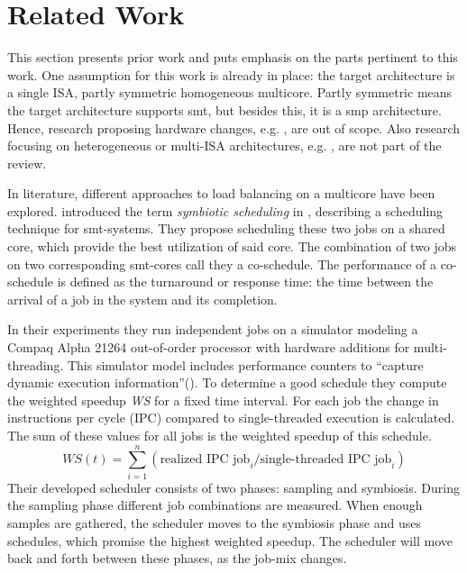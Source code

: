 \section{Related Work}
\label{state:related}

This section presents prior work and puts emphasis on the parts pertinent to
this work.
One assumption for this work is already in place:
the target architecture is a single ISA, partly symmetric homogeneous
multicore.
Partly symmetric means the target architecture supports \gls{smt},
but besides this, it is a \gls{smp} architecture.
Hence, research proposing hardware changes, e.g. \cite{cruz_dynamic_2014},
are out of scope.
Also research focusing on heterogeneous or multi-ISA architectures, e.g.
\cite{sarma_smartbalance_2015}, are not part of the review.



In literature, different approaches to load balancing on a multicore have been
explored.
\citeauthor{snavely_symbiotic_2000} introduced the term \emph{symbiotic
scheduling} in \cite{snavely_symbiotic_2000}, describing a scheduling technique
for \gls{smt}-systems.
They propose scheduling these two jobs on a shared core, which provide the best
utilization of said core.
The combination of two jobs on two corresponding \gls{smt}-cores call they a
co-schedule.
The performance of a co-schedule is defined as the turnaround or response time:
the time between the arrival of a job in the system and its completion.

In their experiments they run independent jobs on a simulator modeling a Compaq
Alpha 21264 out-of-order processor with hardware additions for multi-threading.
This simulator model includes performance counters to ``capture dynamic execution
information''(\autocite[236]{snavely_symbiotic_2000}).
To determine a good schedule they compute the weighted speedup \textit{WS} for
a fixed time interval.
For each job the change in instructions per cycle (IPC) compared to
single-threaded execution is calculated.
The sum of these values for all jobs is the weighted speedup of this
schedule.
$$ WS(t) = \sum_{i=1}^n (\text{realized IPC job}_i / \text{single-threaded IPC
job}_i)$$
Their developed scheduler consists of two phases: sampling and symbiosis.
During the sampling phase different job combinations are measured.
When enough samples are gathered, the scheduler moves to the symbiosis phase
and uses schedules, which promise the highest weighted speedup.
The scheduler will move back and forth between these phases, as the job-mix
changes.

